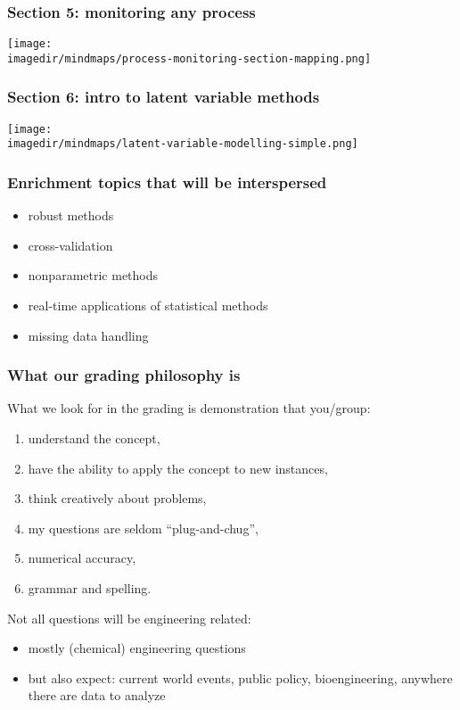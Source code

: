 \begin{frame}\frametitle{Section 5: monitoring any process}
	\texttt{[image: \\imagedir/mindmaps/process-monitoring-section-mapping.png]}
\end{frame}

\begin{frame}\frametitle{Section 6: intro to latent variable methods}

	\texttt{[image: \\imagedir/mindmaps/latent-variable-modelling-simple.png]}
\end{frame}

\begin{frame}\frametitle{Enrichment topics that will be interspersed}
	\begin{itemize}
		\item	robust methods
		\item	cross-validation
		\item	nonparametric methods
		\item	real-time applications of statistical methods
		\item	missing data handling
	\end{itemize}
\end{frame}

\begin{frame}\frametitle{What our grading philosophy is}
	What we look for in the grading is demonstration that you/group:
	\begin{enumerate}
		\item	understand the concept,
		\item	have the ability to apply the concept to new instances,
		\item	think creatively about problems,
		\item	my questions are seldom ``plug-and-chug'',
		\item	numerical accuracy,
		\item	grammar and spelling.
	\end{enumerate}

	\vspace{12pt}
	Not all questions will be engineering related:
	\begin{itemize}
		\item	mostly (chemical) engineering questions
		\item	but also expect: current world events, public policy, bioengineering, anywhere there are data to analyze
	\end{itemize}
\end{frame}

